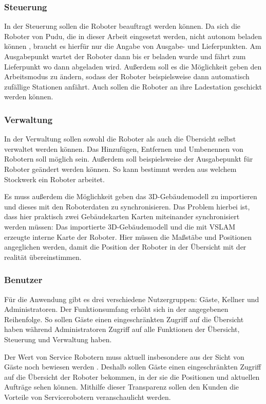 \subsubsection{Steuerung}

In der Steuerung sollen die Roboter beauftragt werden können. Da sich die Roboter von Pudu, die in dieser Arbeit eingesetzt werden, nicht autonom beladen können \cite{KettyBot2024}, braucht es hierfür nur die Angabe von Ausgabe- und Lieferpunkten. Am Ausgabepunkt wartet der Roboter dann bis er beladen wurde und fährt zum Lieferpunkt wo dann abgeladen wird. Außerdem soll es die Möglichkeit geben den Arbeitsmodus zu ändern, sodass der Roboter beispielsweise dann automatisch zufällige Stationen anfährt. Auch sollen die Roboter an ihre Ladestation geschickt werden können.

\subsubsection{Verwaltung}

In der Verwaltung sollen sowohl die Roboter als auch die Übersicht selbst verwaltet werden können. Das Hinzufügen, Entfernen und Umbenennen von Robotern soll möglich sein. Außerdem soll beispielsweise der Ausgabepunkt für Roboter geändert werden können. So kann bestimmt werden aus welchem Stockwerk ein Roboter arbeitet.

Es muss außerdem die Möglichkeit geben das 3D-Gebäudemodell zu importieren und dieses mit den Roboterdaten zu synchronisieren. Das Problem hierbei ist, dass hier praktisch zwei Gebäudekarten Karten miteinander synchronisiert werden müssen: Das importierte 3D-Gebäudemodell und die mit \ac{VSLAM} erzeugte interne Karte der Roboter. Hier müssen die Maßstäbe und Positionen angeglichen werden, damit die Position der Roboter in der Übersicht mit der realität übereinstimmen.

\subsubsection{Benutzer}

Für die Anwendung gibt es drei verschiedene Nutzergruppen: Gäste, Kellner und Administratoren. Der Funktionsumfang erhöht sich in der angegebenen Reihenfolge. So sollen Gäste einen eingeschränkten Zugriff auf die Übersicht haben während Administratoren Zugriff auf alle Funktionen der Übersicht, Steuerung und Verwaltung haben.

Der Wert von Service Robotern muss aktuell insbesondere aus der Sicht von Gäste noch bewiesen werden \cite[S.~429]{Paluch2020}. Deshalb sollen Gäste einen eingeschränkten Zugriff auf die Übersicht der Roboter bekommen, in der sie die Positionen und aktuellen Aufträge sehen können. Mithilfe dieser Transparenz sollen den Kunden die Vorteile von Servicerobotern veranschaulicht werden.

